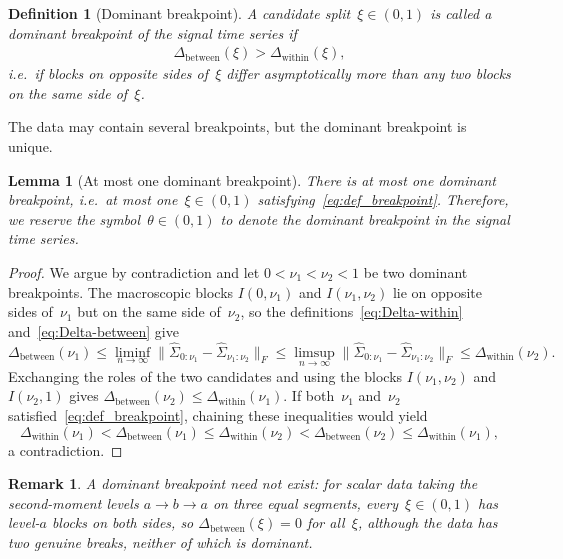\documentclass[10pt, letterpaper]{amsart}
\newtheorem{lem}[theorem]{Lemma}
\newtheorem{remark}[theorem]{Remark}
\newtheorem{defn}[theorem]{Definition}
\begin{document}
\begin{defn}[Dominant breakpoint]\label{def:pathwise_breakpoint}
A candidate split~$\xi\in(0,1)$ is called a \emph{dominant breakpoint} of the signal time series if
\begin{align}\label{eq:def_breakpoint}
\Delta_{\mathrm{between}}(\xi)>\Delta_{\mathrm{within}}(\xi),
\end{align}
i.e.~if blocks on opposite sides of~$\xi$ differ asymptotically more than any two blocks on the same side of~$\xi$. 
\end{defn}
The data may contain several breakpoints, but the dominant breakpoint is unique. 
\begin{lem}[At most one dominant breakpoint]\label{lem:unique_breakpoint}
There is at most one dominant breakpoint, i.e.~at most one~$\xi\in(0,1)$ satisfying~\eqref{eq:def_breakpoint}. Therefore, we reserve the symbol~$\theta \in (0,1)$ to denote the dominant breakpoint in the signal time series. 
\end{lem}
\begin{proof}
We argue by contradiction and let $0<\nu_1<\nu_2<1$ be two dominant breakpoints. The macroscopic blocks $I(0,\nu_1)$ and $I(\nu_1,\nu_2)$ lie on opposite sides of~$\nu_1$ but on the same side of~$\nu_2$, so the definitions~\eqref{eq:Delta-within} and~\eqref{eq:Delta-between} give
\[
\Delta_{\mathrm{between}}(\nu_1)
\leq\liminf_{n\to\infty}\big\|\widehat\Sigma_{0:\nu_1}-\widehat\Sigma_{\nu_1:\nu_2}\big\|_F
\leq\limsup_{n\to\infty}\big\|\widehat\Sigma_{0:\nu_1}-\widehat\Sigma_{\nu_1:\nu_2}\big\|_F
\leq\Delta_{\mathrm{within}}(\nu_2).
\]
Exchanging the roles of the two candidates and using the blocks $I(\nu_1,\nu_2)$ and $I(\nu_2,1)$ gives $\Delta_{\mathrm{between}}(\nu_2)\leq\Delta_{\mathrm{within}}(\nu_1)$. If both~$\nu_1$ and~$\nu_2$ satisfied~\eqref{eq:def_breakpoint}, chaining these inequalities would yield
\[
\Delta_{\mathrm{within}}(\nu_1)
<\Delta_{\mathrm{between}}(\nu_1)
\leq\Delta_{\mathrm{within}}(\nu_2)
<\Delta_{\mathrm{between}}(\nu_2)
\leq\Delta_{\mathrm{within}}(\nu_1),
\]
a contradiction.
\end{proof}
\begin{remark}
  A dominant breakpoint need not exist: for scalar data taking the second-moment levels $a\to b\to a$ on three equal segments, every~$\xi\in(0,1)$ has level-$a$ blocks on both sides, so $\Delta_{\mathrm{between}}(\xi)=0$ for all~$\xi$, although the data has two genuine breaks, neither of which is dominant.
\end{remark}
\end{document}
